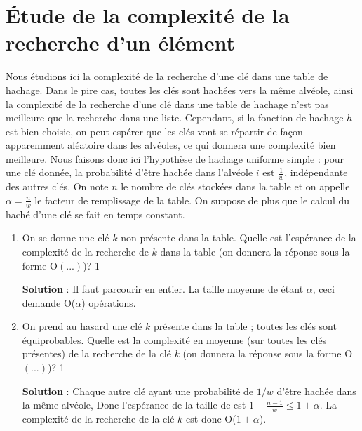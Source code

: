 \documentclass[10pt,a4paper, varwidth]{article}
\def\cor{1}
\begin{document}
	\section{Étude de la complexité de la recherche d'un élément}
	Nous étudions ici la complexité de la recherche d'une clé dans une table de hachage. Dans le pire cas, toutes les
	clés sont hachées vers la même alvéole, ainsi la complexité de la recherche d'une clé dans une table de hachage
	n'est pas meilleure que la recherche dans une liste. Cependant, si la fonction de hachage $h$ est bien choisie, 
    on peut espérer que les clés vont se répartir de façon apparemment aléatoire dans les alvéoles, ce qui donnera une
	complexité bien meilleure.
	Nous faisons donc ici l'hypothèse de hachage uniforme simple : pour une clé donnée, la probabilité d'être hachée
	dans l'alvéole $i$ est $\frac{1}{w}$, indépendante des autres clés. On note $n$ le nombre de clés stockées dans la table et on
	appelle $\alpha = \frac{n}{w}$ le facteur de remplissage de la table. On suppose de plus que le calcul du haché d'une clé se
	fait en temps constant.
	
	\begin{enumerate}
		\item On se donne une clé $k$ non présente dans la table. Quelle est l'espérance de la complexité de la
		recherche de $k$ dans la table (on donnera la réponse sous la forme O$(...)$)?
        \if\cor1
        \begin{emphase}
            \textbf{Solution} : Il faut parcourir  en entier. La taille moyenne
            de  étant $\alpha$, ceci demande O($\alpha$) opérations.
        \end{emphase}
        \fi
		\item On prend au hasard une clé $k$ présente dans la table ; toutes les clés sont équiprobables. 
        Quelle est la complexité en moyenne (sur toutes les clés présentes) de
		la recherche de la clé $k$ (on donnera la réponse sous la forme O$(...)$)?
        \if\cor1
        \begin{emphase}
            \textbf{Solution} : Chaque autre clé ayant une probabilité de $1/w$ d'être hachée dans la même alvéole,
            Donc l'espérance de la taille de  est $1 + \frac{n - 1}{w} \leq 1 + \alpha$.
            La complexité de la recherche de la clé $k$ est donc O($1 + \alpha$).
        \end{emphase}
        \fi
	\end{enumerate}
	
\end{document}
